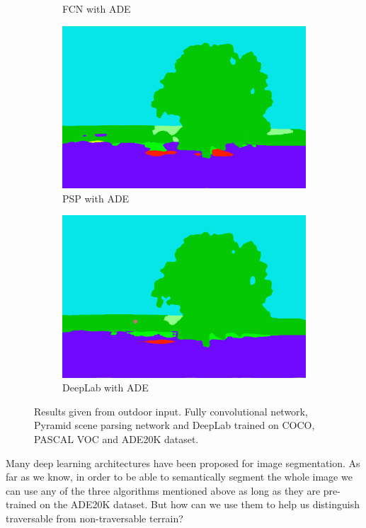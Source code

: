 \documentclass[12pt,a4paper,table,dvipsnames,tikz]{report}
\newcommand{\acronym}{\MakeUppercase}
\begin{document}
\begin{figure}[h!]
\begin{subfigure}[b]{0.3\textwidth}
			\caption{\acronym{fcn} with \acronym{ade}}
		\end{subfigure}
		\begin{subfigure}[b]{0.3\textwidth}
			\includegraphics[width=\textwidth]{out_ade_psp}
			\caption{\acronym{psp} with \acronym{ade}}
		\end{subfigure}
		\begin{subfigure}[b]{0.3\textwidth}
			\includegraphics[width=\textwidth]{out_ade_deep}
			\caption{DeepLab with \acronym{ade}}
		\end{subfigure}
		\caption{Results given from outdoor input. Fully convolutional network, Pyramid 
			scene parsing network and DeepLab trained on \acronym{coco}, \acronym{pascal voc} 
			and \acronym{ade20k} dataset.}
		\label{fig:out}
	\end{figure}
	
	
	Many deep learning architectures have been proposed for image segmentation. As far as
	we know, in order to be able to semantically segment the whole image we can use any 
	of the three algorithms mentioned above as long as they are pre-trained on the 
	\acronym{ade20k} dataset. But how can we use them to help us distinguish traversable 
	from non-traversable terrain?
	\\
		
\end{document}
